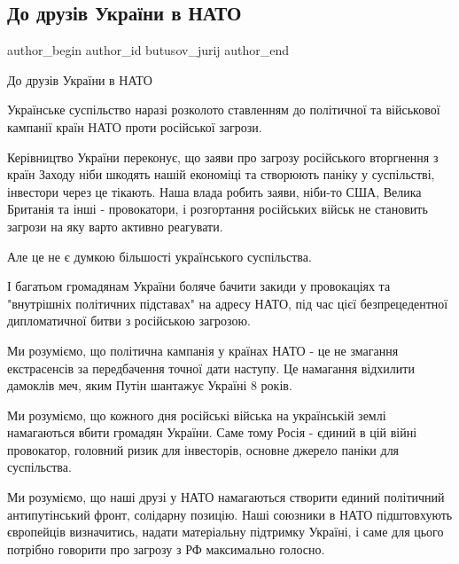  
 
 
 
 
 
\subsection{До друзів України в НАТО}
\label{sec:01_02_2022.fb.butusov_jurij.1.druzi_ukrainy_v_nato}
 
\ifcmt
 author_begin
   author_id butusov_jurij
 author_end
\fi

До друзів України в НАТО

Українське суспільство наразі розколото ставленням до політичної та військової
кампанії країн НАТО проти російської загрози. 

Керівництво України переконує, що заяви про загрозу російського вторгнення з
країн Заходу ніби шкодять нашій економіці та створюють паніку у суспільстві,
інвестори через це тікають. Наша влада робить заяви, ніби-то США, Велика
Британія та інші - провокатори, і розгортання російських військ не становить
загрози на яку варто активно реагувати. 

Але це не є думкою більшості українського суспільства.

І багатьом громадянам України боляче  бачити закиди у провокаціях та
"внутрішніх політичних підставах" на адресу НАТО, під час цієї безпрецедентної
дипломатичної битви з російською загрозою.

Ми розуміємо, що  політична кампанія у країнах НАТО - це не змагання
екстрасенсів за передбачення точної дати наступу. Це намагання відхилити
дамоклів меч, яким Путін шантажує Україні 8 років.

Ми розуміємо, що кожного дня російські війська на українській землі намагаються
вбити громадян України. Саме тому Росія - єдиний в цій війні провокатор,
головний ризик для інвесторів,  основне джерело паніки для суспільства.  

Ми розуміємо, що  наші друзі  у НАТО намагаються створити единий політичний
антипутінський фронт, солідарну позицію. Наші союзники в НАТО підштовхують
європейців визначитись, надати матеріальну підтримку Україні, і саме для цього
потрібно говорити про загрозу з РФ максимально голосно. 

